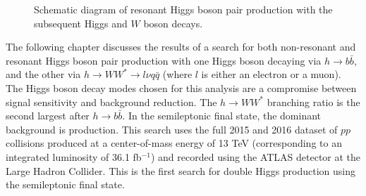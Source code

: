 \begin{figure}[!h] 
\begin{center}
  \caption{Schematic diagram of resonant Higgs boson pair production with the
    subsequent Higgs and $W$ boson decays.}
  \label{fig:resonant_hh_production}
\end{center}
\end{figure}

The following chapter discusses the results of a search for both non-resonant and resonant Higgs boson pair production with one Higgs boson decaying via $h \to b \bar{b}$, and the other via $h \to WW^{\ast} \to l\nu q\bar{q}$ (where $l$ is either an electron or a muon). The Higgs boson decay modes chosen for this analysis are a compromise between signal sensitivity and background reduction. The $h \to WW^{\ast}$ branching ratio is the second largest after $h \to b \bar{b}$. In the semileptonic \bbWW final state, the dominant background is \ttbar production. This search uses the full 2015 and 2016 dataset of $pp$ collisions produced at a center-of-mass energy of 13 TeV (corresponding to an integrated luminosity of 36.1 fb$^{-1}$) and recorded using the ATLAS detector at the Large Hadron Collider. This is the first search for double Higgs production using the semileptonic \bbWW final state.
